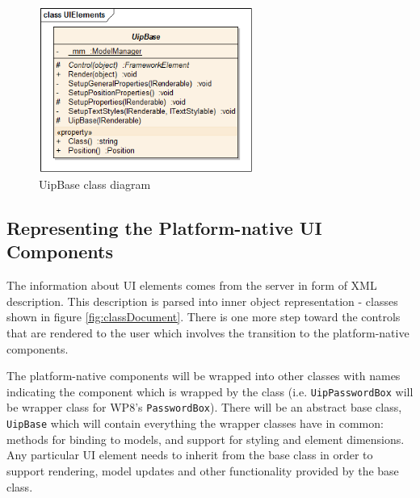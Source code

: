 \begin{figure}[ht!]
\centering
\includegraphics[width=70mm]{pics/3/classUipBase.png}
\caption{UipBase class diagram}
\label{fig:classUipBase}
\end{figure}


\subsection{Representing the Platform-native UI Components}
The information about UI elements comes from the server in form of XML description. This description is parsed into inner object representation - classes shown in figure \ref{fig:classDocument}. There is one more step toward the controls that are rendered to the user which involves the transition to the platform-native components.

The platform-native components will be wrapped into other classes with names indicating the component which is wrapped by the class (i.e. \texttt{UipPasswordBox} will be wrapper class for WP8's \texttt{PasswordBox}). There will be an abstract base class, \texttt{UipBase} which will contain everything the wrapper classes have in common: methods for binding to models, and support for styling and element dimensions.\\
Any particular UI element needs to inherit from the base class in order to support rendering, model updates and other functionality provided by the base class.

